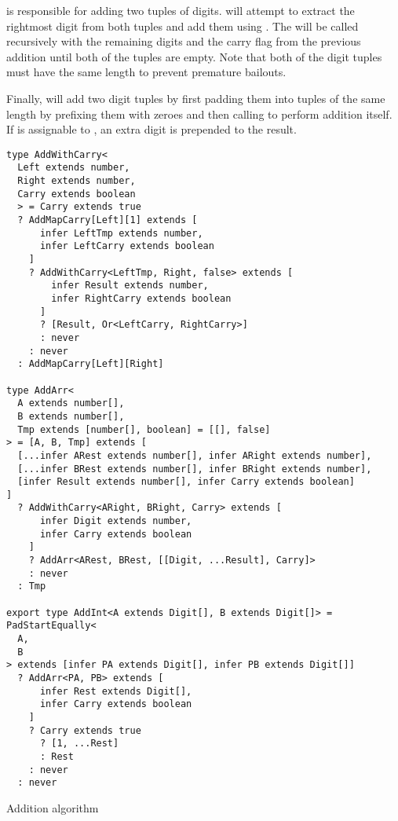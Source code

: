  is responsible for adding two tuples of digits.  will attempt to extract the rightmost digit from both tuples and add them using . The  will be called recursively with the remaining digits and the carry flag from the previous addition until both of the tuples are empty. Note that both of the digit tuples must have the same length to prevent premature bailouts.

Finally,  will add two digit tuples by first padding them into tuples of the same length by prefixing them with zeroes and then calling  to perform addition itself. If  is assignable to , an extra  digit is prepended to the result.

\clearpage

\begin{listing}[ht!]
  \begin{verbatim}
type AddWithCarry<
  Left extends number,
  Right extends number,
  Carry extends boolean
  > = Carry extends true
  ? AddMapCarry[Left][1] extends [
      infer LeftTmp extends number,
      infer LeftCarry extends boolean
    ]
    ? AddWithCarry<LeftTmp, Right, false> extends [
        infer Result extends number,
        infer RightCarry extends boolean
      ]
      ? [Result, Or<LeftCarry, RightCarry>]
      : never
    : never
  : AddMapCarry[Left][Right]

type AddArr<
  A extends number[],
  B extends number[],
  Tmp extends [number[], boolean] = [[], false]
> = [A, B, Tmp] extends [
  [...infer ARest extends number[], infer ARight extends number],
  [...infer BRest extends number[], infer BRight extends number],
  [infer Result extends number[], infer Carry extends boolean]
]
  ? AddWithCarry<ARight, BRight, Carry> extends [
      infer Digit extends number,
      infer Carry extends boolean
    ]
    ? AddArr<ARest, BRest, [[Digit, ...Result], Carry]>
    : never
  : Tmp

export type AddInt<A extends Digit[], B extends Digit[]> = PadStartEqually<
  A,
  B
> extends [infer PA extends Digit[], infer PB extends Digit[]]
  ? AddArr<PA, PB> extends [
      infer Rest extends Digit[],
      infer Carry extends boolean
    ]
    ? Carry extends true
      ? [1, ...Rest]
      : Rest
    : never
  : never
\end{verbatim}
  \caption{Addition algorithm}\label{lst:addition-algorithm}
\end{listing}

\clearpage


